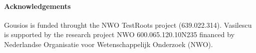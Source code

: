 
\paragraph*{Acknowledgements}
\label{sec:acknowledgements}

Gousios is funded throught the NWO TestRoots project (639.022.314).
Vasilescu is supported by the research project NWO 600.065.120.10N235 financed by Nederlandse Organisatie voor Wetenschappelijk Onderzoek (NWO). 
